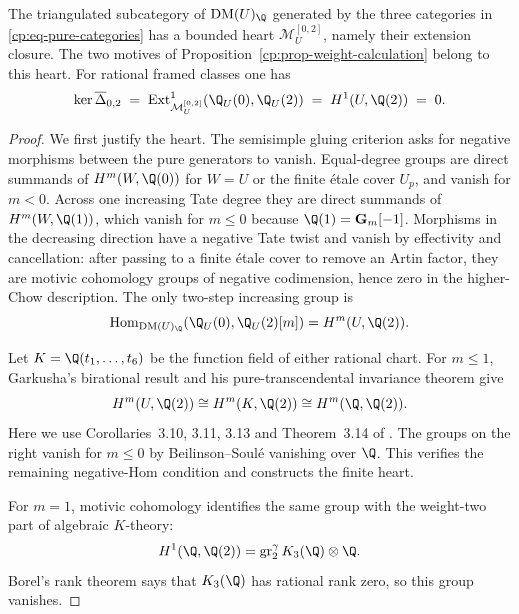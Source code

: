 \begin{lemma}
\label{cp:lem-three-weight-rigidity}
The triangulated subcategory of \(\DM(U)_\Q\) generated by the three
categories in \eqref{cp:eq-pure-categories} has a bounded heart
\(\mathcal M_U^{[0,2]}\), namely their extension closure.  The two motives
of Proposition~\ref{cp:prop-weight-calculation} belong to this heart.
For rational framed classes one has
\begin{equation}
 \ker\overline\Delta_{0,2}
 \;=\;
 \Ext^1_{\mathcal M_U^{[0,2]}}
       (\Q_U(0),\Q_U(2))
 \;=\;H^1(U,\Q(2))
 \;=\;0.
 \label{cp:eq-primitive-kernel-zero}
\end{equation}
\end{lemma}

\begin{proof}
We first justify the heart.  The semisimple gluing criterion
\cite[Chapter~5, Section~1]{Goncharov1999} asks for negative morphisms
between the pure generators to vanish.  Equal-degree groups are direct
summands of \(H^m(W,\Q(0))\) for \(W=U\) or the finite \'{e}tale cover
\(U_p\), and vanish for \(m<0\).  Across one increasing Tate degree they
are direct summands of \(H^m(W,\Q(1))\), which vanish for \(m\leq0\)
because \(\Q(1)=\Gm[-1]\).  Morphisms in the decreasing direction have a
negative Tate twist and vanish by effectivity and cancellation: after
passing to a finite \'{e}tale cover to remove an Artin factor, they are
motivic cohomology groups of negative codimension, hence zero in the
higher-Chow description.  The only
two-step increasing group is
\[
 \operatorname{Hom}_{\DM(U)_\Q}
   (\Q_U(0),\Q_U(2)[m])=H^m(U,\Q(2)).
\]

Let \(K=\Q(t_1,\ldots,t_6)\) be the function field of either rational
chart.  For \(m\leq1\), Garkusha's birational result and his
pure-transcendental invariance theorem give
\begin{equation}
 H^m(U,\Q(2))\cong H^m(K,\Q(2))
 \cong H^m(\Q,\Q(2)).
 \label{cp:eq-garkusha-reduction}
\end{equation}
Here we use Corollaries~3.10, 3.11, 3.13 and Theorem~3.14 of
\cite{Garkusha2023}.  The groups on the right vanish for \(m\leq0\) by
Beilinson--Soul\'{e} vanishing over \(\Q\).  This verifies the remaining
negative-Hom condition and constructs the finite heart.

For \(m=1\), motivic cohomology identifies the same group with the
weight-two part of algebraic \(K\)-theory:
\[
 H^1(\Q,\Q(2))
 =\gr_2^\gamma K_3(\Q)\otimes\Q.
\]
Borel's rank theorem says that \(K_3(\Q)\) has rational rank zero, so this
group vanishes.


\end{proof}
